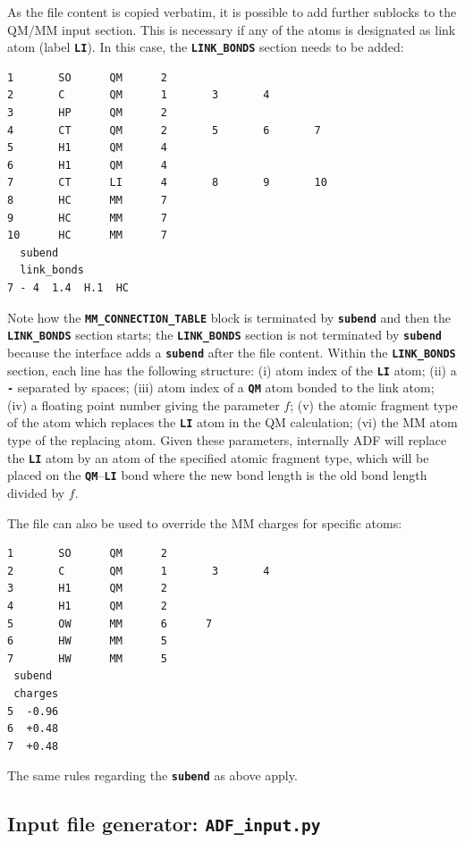 \documentclass[a4paper,10pt,DIV=15,openany,twoside=false]{scrbook}
\newcommand{\ttt}[1]{\textbf{\texttt{#1}}}
\newenvironment{example}{
  \setlength{\OuterFrameSep}{3pt}
  \vspace{0mm}
  \definecolor{shadecolor}{HTML}{E4F4FF}
  \begin{shaded}
}{
  \end{shaded}
}
\begin{document}
As the file content is copied verbatim, it is possible to add further sublocks to the QM/MM input section.
This is necessary if any of the atoms is designated as link atom (label \ttt{LI}).
In this case, the \ttt{LINK\_BONDS} section needs to be added:
\begin{example}
  \begin{verbatim}
1       SO      QM      2
2       C       QM      1       3       4
3       HP      QM      2
4       CT      QM      2       5       6       7
5       H1      QM      4
6       H1      QM      4
7       CT      LI      4       8       9       10
8       HC      MM      7
9       HC      MM      7
10      HC      MM      7
  subend
  link_bonds
7 - 4  1.4  H.1  HC
\end{verbatim}
\end{example}
Note how the \ttt{MM\_CONNECTION\_TABLE} block is terminated by \ttt{subend} and then the \ttt{LINK\_BONDS} section starts; the \ttt{LINK\_BONDS} section is not terminated by \ttt{subend} because the interface adds a \ttt{subend} after the file content.
Within the \ttt{LINK\_BONDS} section, each line has the following structure: (i) atom index of the \ttt{LI} atom; (ii) a \ttt{-} separated by spaces; (iii) atom index of a \ttt{QM} atom bonded to the link atom; (iv) a floating point number giving the parameter $f$; (v) the atomic fragment type of the atom which replaces the \ttt{LI} atom in the QM calculation; (vi) the MM atom type of the replacing atom.
Given these parameters, internally ADF will replace the \ttt{LI} atom by an atom of the specified atomic fragment type, which will be placed on the \ttt{QM}--\ttt{LI} bond where the new bond length is the old bond length divided by $f$.

The file can also be used to override the MM charges for specific atoms:
\begin{example}
  \begin{verbatim}
1       SO      QM      2
2       C       QM      1       3       4
3       H1      QM      2
4       H1      QM      2
5       OW      MM      6      7
6       HW      MM      5
7       HW      MM      5
 subend
 charges
5  -0.96
6  +0.48
7  +0.48
\end{verbatim}
\end{example}
The same rules regarding the \ttt{subend} as above apply.


\subsection{Input file generator: \ttt{ADF\_input.py}}\label{sec:ADF_input.py}
\end{document}
